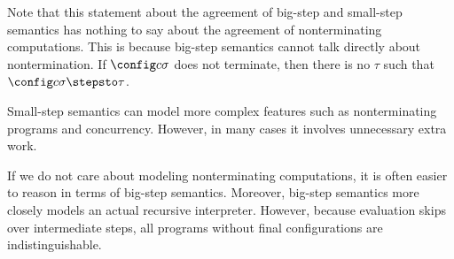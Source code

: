 Note that this statement about the agreement of big-step and
small-step semantics has nothing to say about the agreement of
nonterminating computations.  This is because big-step semantics
cannot talk directly about nontermination. If $\config c\sigma$ does
not terminate, then there is no $\tau$ such that $\config
c\sigma\stepsto\tau$.

Small-step semantics can model more complex features such as
nonterminating programs and concurrency. However, in many cases it
involves unnecessary extra work.

If we do not care about modeling nonterminating computations, it is
often easier to reason in terms of big-step semantics. Moreover,
big-step semantics more closely models an actual recursive
interpreter. However, because evaluation skips over intermediate
steps, all programs without final configurations are
indistinguishable.
